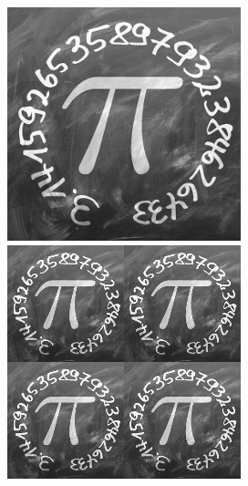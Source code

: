 \documentclass[12pt,class=report,crop=false]{standalone}
\begin{document}
\begin{center}
\includegraphics[scale=0.4]{images_fiche/pi_gimp_new_photo_0.png}\qquad\qquad
\includegraphics[scale=0.4]{images_fiche/pi_gimp_new_photo_1.png}
\end{center}
\end{document}
